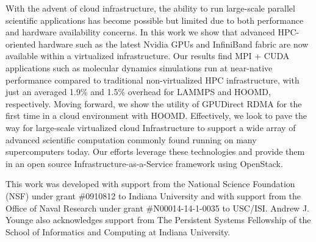 \documentclass[10pt]{sigplanconf}
\begin{document}
With the advent of cloud infrastructure, the ability to run large-scale parallel scientific applications has become possible but limited due to both performance and hardware availability concerns. In this work we show that advanced HPC-oriented hardware such as the latest Nvidia GPUs and InfiniBand fabric are now available within a virtualized infrastructure. Our results find MPI + CUDA applications such as molecular dynamics simulations run at near-native performance compared to traditional non-virtualized HPC infrastructure, with just an averaged 1.9\% and 1.5\% overhead for LAMMPS and HOOMD, respectively. Moving forward, we show the utility of GPUDirect RDMA for the first time in a cloud environment with HOOMD.  Effectively, we look to pave the way for large-scale virtualized cloud Infrastructure to support a wide array of advanced scientific computation commonly found running on many supercomputers today.  Our efforts leverage these technologies and provide them in an open source Infrastructure-as-a-Service framework using OpenStack.  







\acks

This work was developed with support from the National Science Foundation (NSF)
under grant \#0910812 to Indiana University and with support from the Office
of Naval Research under grant \#N00014-14-1-0035 to USC/ISI.  Andrew J. Younge also
acknowledges support from The Persistent Systems Fellowship of the School of
Informatics and Computing at Indiana University.


%



\end{document}
